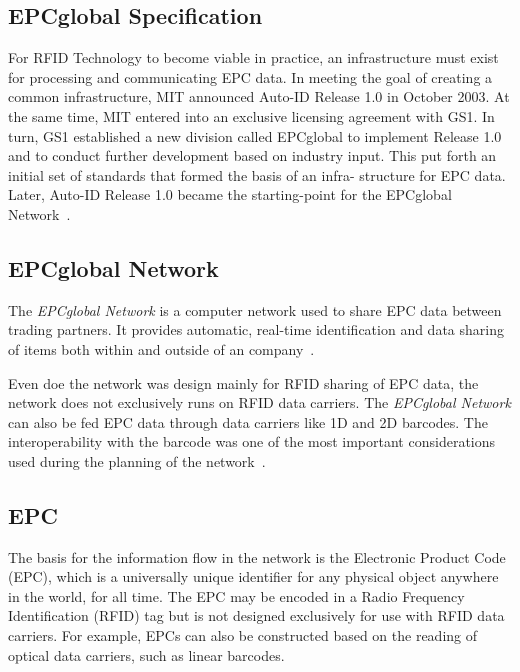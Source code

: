\subsection{EPCglobal Specification}

For RFID Technology to become viable in practice, an infrastructure must exist for processing and communicating EPC data. In meeting the goal of creating a common infrastructure, MIT announced Auto-ID Release 1.0 in October 2003. At the same time, MIT entered into an exclusive licensing agreement with GS1.
In turn, GS1 established a new division called EPCglobal to implement Release 1.0 and to conduct further development based on industry input. This put forth an initial set of standards that formed the basis of an infra- structure for EPC data. Later, Auto-ID Release 1.0 became the starting-point for the EPCglobal Network~\cite[p. 50]{GlobalRFIDValue}. 


\subsection{EPCglobal Network}

The \emph{EPCglobal Network} is a computer network used to share \gls{EPC} data between trading partners. 
It provides automatic, real-time identification and data sharing of items both within and outside of an company~\cite[p. 213]{lahiriRFIDSourcebook2005}.

Even doe the network was design mainly for \gls{RFID} sharing of \gls{EPC} data, the network does not exclusively runs on \gls{RFID} data carriers. The \emph{EPCglobal Network} can also be fed \gls{EPC} data through data carriers like 1D and 2D barcodes. The interoperability with the barcode was one of the most important considerations used during the planning of the network~\cite{RFIDBarcodeInteroperability}.


\subsection{EPC}

The basis for the information flow in the network is the Electronic Product Code (EPC), which is a universally unique identifier for any physical object anywhere in the world, for all time. 
The EPC may be encoded in a Radio Frequency Identification (RFID) tag but is not designed exclusively for use with RFID data carriers. For example, EPCs can also be constructed based on the reading of optical data carriers, such as linear barcodes.


